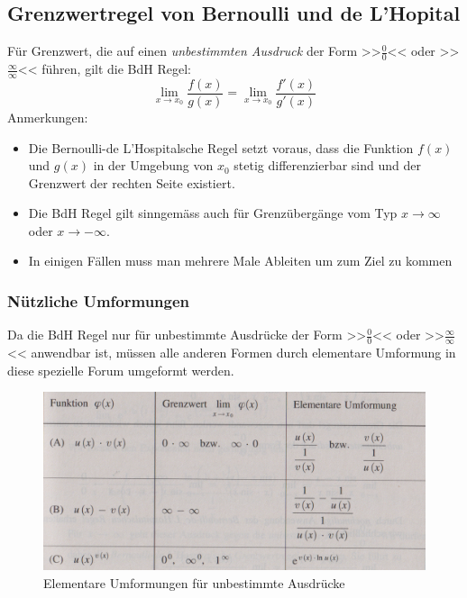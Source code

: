 \subsection{Grenzwertregel von Bernoulli und de L'Hopital}
\begin{definition}
Für Grenzwert, die auf einen \textit{unbestimmten Ausdruck} der Form >>$\frac{0}{0}$<< oder >>$\frac{\infty}{\infty}$<< führen, gilt die BdH Regel:
$$\lim\limits_{x \rightarrow x_0} \frac{f(x)}{g(x)} = \lim\limits_{x \rightarrow x_0} \frac{f'(x)}{g'(x)}$$
Anmerkungen:
\begin{itemize}
	\item Die Bernoulli-de L'Hospitalsche Regel setzt voraus, dass die Funktion $f(x)$ und $g(x)$ in der Umgebung von $x_0$ stetig differenzierbar sind und der Grenzwert der rechten Seite existiert.
	\item Die BdH Regel gilt sinngemäss auch für Grenzübergänge vom Typ $x \rightarrow \infty$ oder $x \rightarrow -\infty$.
	\item In einigen Fällen muss man mehrere Male Ableiten um zum Ziel zu kommen
\end{itemize}
\end{definition}

\subsubsection*{Nützliche Umformungen}
Da die BdH Regel nur für unbestimmte Ausdrücke der Form >>$\frac{0}{0}$<< oder >>$\frac{\infty}{\infty}$<< anwendbar ist, müssen alle anderen Formen durch elementare Umformung in diese spezielle Forum umgeformt werden.
\begin{figure}[H]
\centering 
	\includegraphics[width=1\textwidth]{Bilder/bdh-umformungstabelle}
\caption{Elementare Umformungen für unbestimmte Ausdrücke}
\end{figure} 
